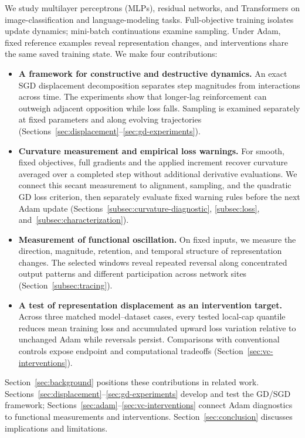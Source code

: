 We study multilayer perceptrons (MLPs), residual networks, and Transformers on image-classification and language-modeling tasks. Full-objective training isolates update dynamics; mini-batch continuations examine sampling. Under Adam, fixed reference examples reveal representation changes, and interventions share the same saved training state. We make four contributions:
\begin{itemize}
\item \textbf{A framework for constructive and destructive dynamics.}
An exact SGD displacement decomposition separates step magnitudes from interactions across time. The experiments show that longer-lag reinforcement can outweigh adjacent opposition while loss falls. Sampling is examined separately at fixed parameters and along evolving trajectories (Sections~\ref{sec:displacement}--\ref{sec:gd-experiments}).

\item \textbf{Curvature measurement and empirical loss warnings.}
For smooth, fixed objectives, full gradients and the applied increment recover curvature averaged over a completed step without additional derivative evaluations. We connect this secant measurement to alignment, sampling, and the quadratic GD loss criterion, then separately evaluate fixed warning rules before the next Adam update (Sections~\ref{subsec:curvature-diagnostic}, \ref{subsec:loss}, and~\ref{subsec:characterization}).

\item \textbf{Measurement of functional oscillation.}
On fixed inputs, we measure the direction, magnitude, retention, and temporal structure of representation changes. The selected windows reveal repeated reversal along concentrated output patterns and different participation across network sites (Section~\ref{subsec:tracing}).

\item \textbf{A test of representation displacement as an intervention target.}
Across three matched model--dataset cases, every tested local-cap quantile reduces mean training loss and accumulated upward loss variation relative to unchanged Adam while reversals persist. Comparisons with conventional controls expose endpoint and computational tradeoffs (Section~\ref{sec:vc-interventions}).
\end{itemize}

Section~\ref{sec:background} positions these contributions in related work. Sections~\ref{sec:displacement}--\ref{sec:gd-experiments} develop and test the GD/SGD framework; Sections~\ref{sec:adam}--\ref{sec:vc-interventions} connect Adam diagnostics to functional measurements and interventions. Section~\ref{sec:conclusion} discusses implications and limitations.
